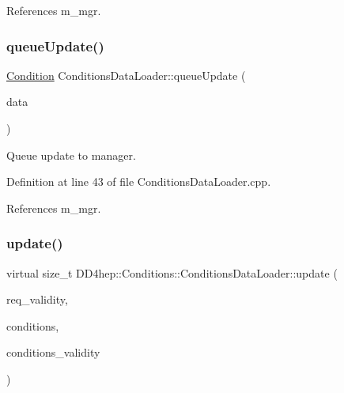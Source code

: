 References m\+\_\+mgr.

\hypertarget{class_d_d4hep_1_1_conditions_1_1_conditions_data_loader_a1538131327aebb04c554cecf4c512bb7}{}\label{class_d_d4hep_1_1_conditions_1_1_conditions_data_loader_a1538131327aebb04c554cecf4c512bb7} 
\subsubsection{\texorpdfstring{queue\+Update()}{queueUpdate()}}
{\footnotesize\ttfamily \hyperlink{class_d_d4hep_1_1_conditions_1_1_condition}{Condition} Conditions\+Data\+Loader\+::queue\+Update (\begin{DoxyParamCaption}\item[{\hyperlink{class_d_d4hep_1_1_conditions_1_1_entry}{Entry} $\ast$}]{data }\end{DoxyParamCaption})\hspace{0.3cm}{\ttfamily [protected]}}



Queue update to manager. 



Definition at line 43 of file Conditions\+Data\+Loader.\+cpp.



References m\+\_\+mgr.

\hypertarget{class_d_d4hep_1_1_conditions_1_1_conditions_data_loader_a927c3e60a4ea2873d97433900783ffc1}{}\label{class_d_d4hep_1_1_conditions_1_1_conditions_data_loader_a927c3e60a4ea2873d97433900783ffc1} 
\subsubsection{\texorpdfstring{update()}{update()}}
{\footnotesize\ttfamily virtual size\+\_\+t D\+D4hep\+::\+Conditions\+::\+Conditions\+Data\+Loader\+::update (\begin{DoxyParamCaption}\item[{const \hyperlink{class_d_d4hep_1_1_conditions_1_1_conditions_data_loader_a510aa9a02f5e798d8d96c9e3cb5a36af}{iov\+\_\+type} \&}]{req\+\_\+validity,  }\item[{\hyperlink{namespace_d_d4hep_1_1_conditions_ae765f0140a33973a430280f02b6062f4}{Range\+Conditions} \&}]{conditions,  }\item[{\hyperlink{class_d_d4hep_1_1_conditions_1_1_conditions_data_loader_a510aa9a02f5e798d8d96c9e3cb5a36af}{iov\+\_\+type} \&}]{conditions\+\_\+validity }\end{DoxyParamCaption})\hspace{0.3cm}{\ttfamily [pure virtual]}}



